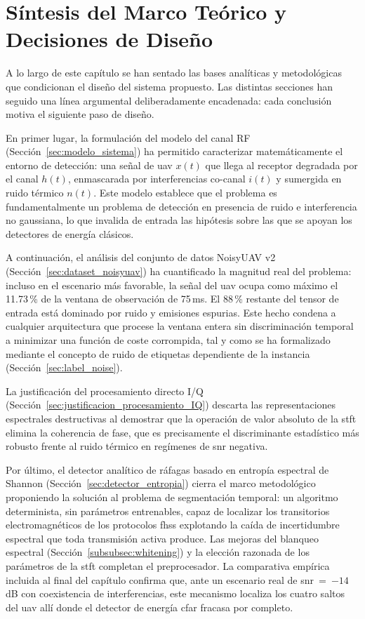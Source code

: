 \section{Síntesis del Marco Teórico y Decisiones de Diseño}
\label{sec:sintesis_cap3}

A lo largo de este capítulo se han sentado las bases analíticas y metodológicas que condicionan el diseño del sistema propuesto. Las distintas secciones han seguido una línea argumental deliberadamente encadenada: cada conclusión motiva el siguiente paso de diseño.

En primer lugar, la formulación del modelo del canal RF (Sección~\ref{sec:modelo_sistema}) ha permitido caracterizar matemáticamente el entorno de detección: una señal de \gls{uav} $x(t)$ que llega al receptor degradada por el canal $h(t)$, enmascarada por interferencias co-canal $i(t)$ y sumergida en ruido térmico $n(t)$. Este modelo establece que el problema es fundamentalmente un problema de detección en presencia de ruido e interferencia no gaussiana, lo que invalida de entrada las hipótesis sobre las que se apoyan los detectores de energía clásicos.

A continuación, el análisis del conjunto de datos NoisyUAV v2 (Sección~\ref{sec:dataset_noisyuav}) ha cuantificado la magnitud real del problema: incluso en el escenario más favorable, la señal del \gls{uav} ocupa como máximo el 11.73\,\% de la ventana de observación de 75\,ms. El 88\,\% restante del tensor de entrada está dominado por ruido y emisiones espurias. Este hecho condena a cualquier arquitectura que procese la ventana entera sin discriminación temporal a minimizar una función de coste corrompida, tal y como se ha formalizado mediante el concepto de ruido de etiquetas dependiente de la instancia (Sección~\ref{sec:label_noise}).

La justificación del procesamiento directo I/Q (Sección~\ref{sec:justificacion_procesamiento_IQ}) descarta las representaciones espectrales destructivas al demostrar que la operación de valor absoluto de la \gls{stft} elimina la coherencia de fase, que es precisamente el discriminante estadístico más robusto frente al ruido térmico en regímenes de \gls{snr} negativa.

Por último, el detector analítico de ráfagas basado en entropía espectral de Shannon (Sección~\ref{sec:detector_entropia}) cierra el marco metodológico proponiendo la solución al problema de segmentación temporal: un algoritmo determinista, sin parámetros entrenables, capaz de localizar los transitorios electromagnéticos de los protocolos \gls{fhss} explotando la caída de incertidumbre espectral que toda transmisión activa produce. Las mejoras del blanqueo espectral (Sección~\ref{subsubsec:whitening}) y la elección razonada de los parámetros de la \gls{stft} completan el preprocesador. La comparativa empírica incluida al final del capítulo confirma que, ante un escenario real de \gls{snr}~=~$-14$\,dB con coexistencia de interferencias, este mecanismo localiza los cuatro saltos del \gls{uav} allí donde el detector de energía \gls{cfar} fracasa por completo.

